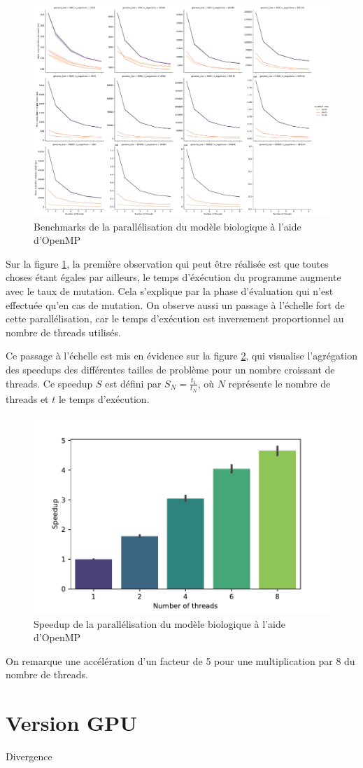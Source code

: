 \documentclass[a4paper, 10pt, twoside]{article}
\begin{document}
\begin{figure}
	\includegraphics[width=\linewidth]{img/benchmark_omp_static.pdf}
	\caption{Benchmarks de la parallélisation du modèle biologique à l'aide d'OpenMP}
	\label{fig:benchmarks/omp}
\end{figure}

Sur la figure \ref{fig:benchmarks/omp}, la première observation qui peut être réalisée est que toutes choses étant égales par ailleurs, le temps d'éxécution du programme augmente avec le taux de mutation. Cela s'explique par la phase d'évaluation qui n'est effectuée qu'en cas de mutation. On observe aussi un passage à l'échelle fort de cette parallélisation, car le temps d'exécution est inversement proportionnel au nombre de threads utilisés.

Ce passage à l'échelle est mis en évidence sur la figure \ref{fig:speedup/omp}, qui visualise l'agrégation des speedups des différentes tailles de problème pour un nombre croissant de threads. Ce speedup $S$ est défini par $ S_N = \frac{t_1}{t_N} $, où $N$ représente le nombre de threads et $t$ le temps d'exécution.

\begin{figure}
	\centering
	\includegraphics[width=0.5\linewidth]{img/speedup.pdf}
	\caption{Speedup de la parallélisation du modèle biologique à l'aide d'OpenMP}
	\label{fig:speedup/omp}
\end{figure}

On remarque une accélération d'un facteur de 5 pour une multiplication par 8 du nombre de threads.

\section{Version GPU}

Divergence \citep{nvidia/branching}





\end{document}
